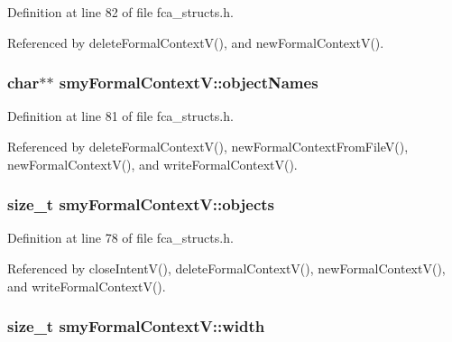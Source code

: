 \-Definition at line 82 of file fca\-\_\-structs.\-h.



\-Referenced by delete\-Formal\-Context\-V(), and new\-Formal\-Context\-V().

\hypertarget{structsmyFormalContextV_aac85d520aa4849d3dfbe4b1c85c17555}{
\subsubsection[{object\-Names}]{\setlength{\rightskip}{0pt plus 5cm}char$\ast$$\ast$ {\bf smy\-Formal\-Context\-V\-::object\-Names}}}\label{structsmyFormalContextV_aac85d520aa4849d3dfbe4b1c85c17555}


\-Definition at line 81 of file fca\-\_\-structs.\-h.



\-Referenced by delete\-Formal\-Context\-V(), new\-Formal\-Context\-From\-File\-V(), new\-Formal\-Context\-V(), and write\-Formal\-Context\-V().

\hypertarget{structsmyFormalContextV_a6870c7afe6748004c41c81bd5e1c65d2}{
\subsubsection[{objects}]{\setlength{\rightskip}{0pt plus 5cm}size\-\_\-t {\bf smy\-Formal\-Context\-V\-::objects}}}\label{structsmyFormalContextV_a6870c7afe6748004c41c81bd5e1c65d2}


\-Definition at line 78 of file fca\-\_\-structs.\-h.



\-Referenced by close\-Intent\-V(), delete\-Formal\-Context\-V(), new\-Formal\-Context\-V(), and write\-Formal\-Context\-V().

\hypertarget{structsmyFormalContextV_ab4456c63ae1536d8a9afa9a42c30cd10}{
\subsubsection[{width}]{\setlength{\rightskip}{0pt plus 5cm}size\-\_\-t {\bf smy\-Formal\-Context\-V\-::width}}}\label{structsmyFormalContextV_ab4456c63ae1536d8a9afa9a42c30cd10}


